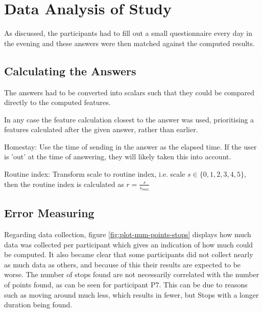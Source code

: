 \section{Data Analysis of Study}
As discussed, the participants had to fill out a small questionnaire every day in the evening and these answers were then matched against the computed results.

\subsection{Calculating the Answers}
The answers had to be converted into scalars such that they could be compared directly to the computed features. 

In any case the feature calculation closest to the answer was used, prioritising a features calculated after the given answer, rather than earlier.

Homestay: Use the time of sending in the answer as the elapsed time. If the user is 'out' at the time of answering, they will likely taken this into account.

Routine index: Transform scale to routine index, i.e. scale $s \in \{0, 1, 2, 3, 4, 5\}$, then the routine index is calculated as $r = \frac{s}{s_{max}}$



\subsection{Error Measuring}

Regarding data collection, figure \ref{fig:plot-num-points-stops} displays how much data was collected per participant which gives an indication of how much could be computed. It also became clear that some participants did not collect nearly as much data as others, and because of this their results are expected to be worse. The number of stops found are not necessarily correlated with the number of points found, as can be seen for participant P7. This can be due to reasons such as moving around much less, which results in fewer, but Stops with a longer duration being found. 

